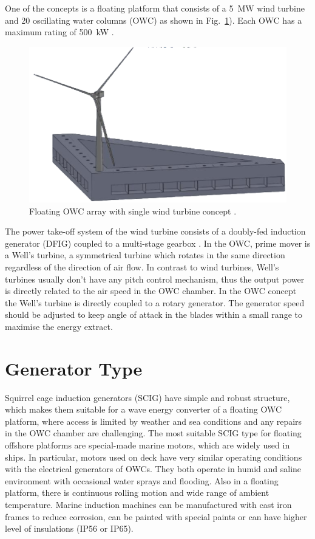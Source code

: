 \documentclass[twocolumn]{article}
\begin{document}
One of the concepts is a floating platform that consists of a 5~MW wind turbine and 20 oscillating water columns (OWC) as shown in Fig.~\ref{owc_array}). Each OWC has a maximum rating of 500~kW \cite{Sullivan2013}.

  \begin{figure}
    \centering
    \includegraphics[]{owc_array}
    \caption{Floating OWC array with single wind turbine concept \cite{Sullivan2013}.} 
    \label{owc_array}
  \end{figure}

The power take-off system of the wind turbine consists of a doubly-fed induction generator (DFIG) coupled to a multi-stage gearbox \cite{Jonkman2009}. In the OWC, prime mover is a Well's turbine, a symmetrical turbine which rotates in the same direction regardless of the direction of air flow. In contrast to wind turbines, Well's turbines usually don't have any pitch control mechanism, thus the output power is directly related to the air speed in the OWC chamber. In the OWC concept the Well's turbine is directly coupled to a rotary generator. The generator speed should be adjusted to keep angle of attack in the blades within a small range to maximise the energy extract.


\section{Generator Type}

Squirrel cage induction generators (SCIG) have simple and robust structure, which makes them suitable for a wave energy converter of a floating OWC platform, where access is limited by weather and sea conditions and any repairs in the OWC chamber are challenging. 
The most suitable SCIG type for floating offshore platforms are special-made marine motors, which are widely used in ships. In particular, motors used on deck have very similar operating conditions with the electrical generators of OWCs. They both operate in humid and saline environment with occasional water sprays and flooding. Also in a floating platform, there is continuous rolling motion and wide range of ambient temperature. Marine induction machines can be manufactured  with cast iron frames to reduce corrosion, can be painted with special paints or can have higher level of insulations (IP56 or IP65). 
\end{document}
